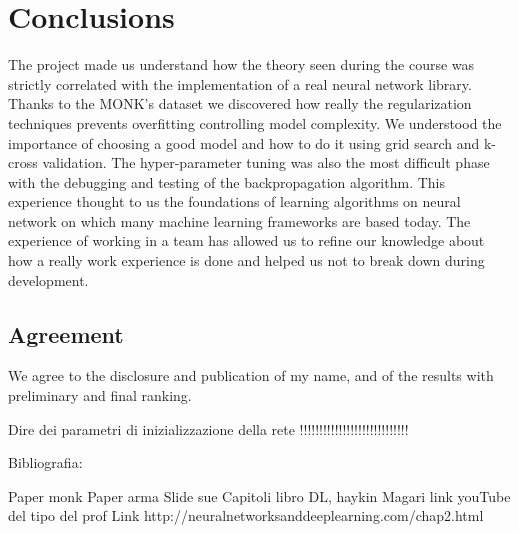 \section{Conclusions}
The project made us understand how the theory seen during the course was strictly correlated with the implementation of a real neural network library. Thanks to the MONK's dataset we discovered how really the regularization techniques prevents overfitting controlling model complexity. We understood the importance of choosing a good model and how to do it using grid search and k-cross validation. The hyper-parameter tuning was also the most difficult phase with the debugging and testing of the backpropagation algorithm. This experience thought to us the foundations of learning algorithms on neural network on which many machine learning frameworks are based today. The experience of working in a team has allowed us to refine our knowledge about how a really work experience is done and helped us not to break down during development.
\subsection{Agreement}
We agree to the disclosure and publication of my name, and of the results with
preliminary and final ranking.

Dire dei parametri di inizializzazione della rete !!!!!!!!!!!!!!!!!!!!!!!!!!!!

Bibliografia:

Paper monk
Paper arma
Slide sue
Capitoli libro  DL, haykin
Magari link youTube del tipo del prof
Link http://neuralnetworksanddeeplearning.com/chap2.html